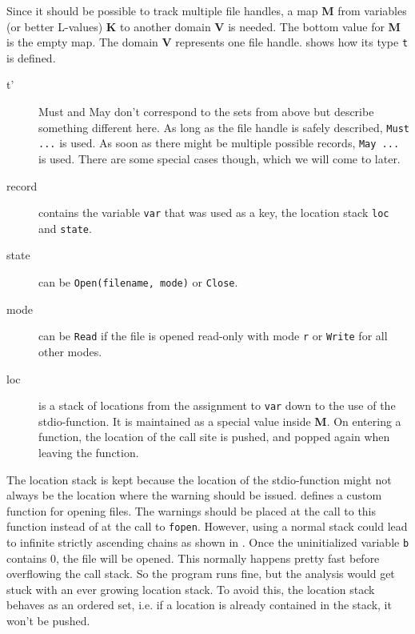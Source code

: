 Since it should be possible to track multiple file handles, a map \textbf{M} from variables (or better L-values) \textbf{K} to another domain \textbf{V} is needed. The bottom value for \textbf{M} is the empty map.
The domain \textbf{V} represents one file handle.  shows how its type \verb|t| is defined.
\begin{description}
\item[t'] Must and May don't correspond to the sets from above but describe something different here. As long as the file handle is safely described, \verb|Must ...| is used. As soon as there might be multiple possible records, \verb|May ...| is used. There are some special cases though, which we will come to later.

\item[record] contains the variable \verb|var| that was used as a key, the location stack \verb|loc| and \verb|state|.

\item[state] can be \verb|Open(filename, mode)| or \verb|Close|.

\item[mode] can be \verb|Read| if the file is opened read-only with mode \verb|r| or \verb|Write| for all other modes.

\item[loc] is a stack of locations from the assignment to \verb|var| down to the use of the stdio-function. It is maintained as a special value inside \textbf{M}. On entering a function, the location of the call site is pushed, and popped again when leaving the function.
\end{description}
The location stack is kept because the location of the stdio-function might not always be the location where the warning should be issued.  defines a custom function for opening files. The warnings should be placed at the call to this function instead of at the call to \verb|fopen|.
However, using a normal stack could lead to infinite strictly ascending chains as shown in . Once the uninitialized variable \verb|b| contains 0, the file will be opened. This normally happens pretty fast before overflowing the call stack. So the program runs fine, but the analysis would get stuck with an ever growing location stack. To avoid this, the location stack behaves as an ordered set, i.e. if a location is already contained in the stack, it won't be pushed. %

